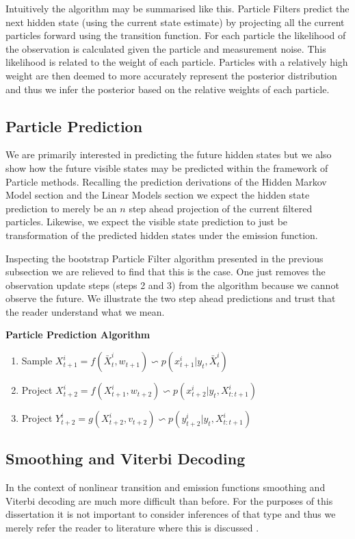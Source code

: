 \documentclass[../masters.tex]{subfiles}
\begin{document}
Intuitively the algorithm may be summarised like this. Particle Filters predict the next hidden state (using the current state estimate) by projecting all the current particles forward using the transition function. For each particle the likelihood of the observation is calculated given the particle and measurement noise. This likelihood is related to the weight of each particle. Particles with a relatively high weight are then deemed to more accurately represent the posterior distribution and thus we infer the posterior based on the relative weights of each particle.

\subsection{Particle Prediction}
We are primarily interested in predicting the future hidden states but we also show how the future visible states may be predicted within the framework of Particle methods. Recalling the prediction derivations of the Hidden Markov Model section and the Linear Models section we expect the hidden state prediction to merely be an $n$ step ahead projection of the current filtered particles. Likewise, we expect the visible state prediction to just be transformation of the predicted hidden states under the emission function. 

Inspecting the bootstrap Particle Filter algorithm presented in the previous subsection we are relieved to find that this is the case. One just removes the observation update steps (steps 2 and 3) from the algorithm because we cannot observe the future. We illustrate the two step ahead predictions and trust that the reader understand what we mean.

\textbf{Particle Prediction Algorithm}
\begin{enumerate}
\item
Sample $X_{t+1}^i = f(\bar{X}_t^i, w_{t+1}) \backsim p(x_{t+1}^i|y_t, \bar{X}_t^i)$ 
\item
Project $X_{t+2}^i = f(X_{t+1}^i, w_{t+2}) \backsim p(x_{t+2}^i|y_t, X_{t:t+1}^i)$ 
\item
Project $Y_{t+2}^i = g(X_{t+2}^i, v_{t+2}) \backsim p(y_{t+2}^i|y_t, X_{t:t+1}^i)$ 
\end{enumerate}

\subsection{Smoothing and Viterbi Decoding}
In the context of nonlinear transition and emission functions smoothing and Viterbi decoding are much more difficult than before. For the purposes of this dissertation it is not important to consider inferences of that type and thus we merely refer the reader to literature where this is discussed \cite{pftut}\cite{gsf1}\cite{murphy1}\cite{murphy2}\cite{barber}.
\end{document}

